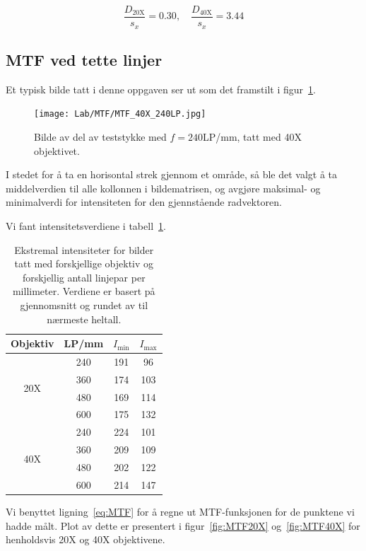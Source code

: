\documentclass[a4paper,11pt, twocolumn]{article}
\begin{document}
\begin{equation}
	\frac{D_{20\text{X}}}{s_x} = 0.30, \quad \frac{D_{40\text{X}}}{s_x} = 3.44
	\label{eq:diffpersx}
\end{equation} 

\subsection{MTF ved tette linjer}
Et typisk bilde tatt i denne oppgaven ser ut som det framstilt i figur~\ref{fig:mtfpic}.
\begin{figure}[!ht]
	\centering
	\texttt{[image: Lab/MTF/MTF\_40X\_240LP.jpg]}
	\caption{Bilde av del av teststykke med $f=240$LP/mm, tatt med 40X objektivet.}
	\label{fig:mtfpic}
\end{figure}

I stedet for å ta en horisontal strek gjennom et område, så ble det valgt å ta middelverdien til alle kollonnen i bildematrisen, og avgjøre maksimal- og minimalverdi for intensiteten for den gjennstående radvektoren.

Vi fant intensitetsverdiene i tabell~\ref{tab:mtfintensitet}. 
\begin{table}
	\centering
	\caption{Ekstremal intensiteter for bilder tatt med forskjellige objektiv og forskjellig antall linjepar per millimeter. Verdiene er basert på gjennomsnitt og rundet av til nærmeste heltall.}
	\label{tab:mtfintensitet}
	\begin{tabular}{cccc}
		\toprule
		\toprule
		Objektiv & LP/mm & $I_\text{min}$ & $I_\text{max}$\\
		\midrule
		\multirow{4}{*}{20X} & 240 &191 & 96 \\
		&360 &174 &103 \\
		&480 &169 &114 \\
		&600 &175 &132 \\
		\midrule
		\multirow{4}{*}{40X} & 240 &224 &101 \\
		&360 &209 &109 \\
		&480 &202 &122 \\
		&600 &214 &147 \\
		\toprule
	\end{tabular}
\end{table}

Vi benyttet ligning~\eqref{eq:MTF} for å regne ut MTF-funksjonen for de punktene vi hadde målt. Plot av dette er presentert i figur~\ref{fig:MTF20X} og~\ref{fig:MTF40X} for henholdsvis 20X og 40X objektivene. 
\end{document}

